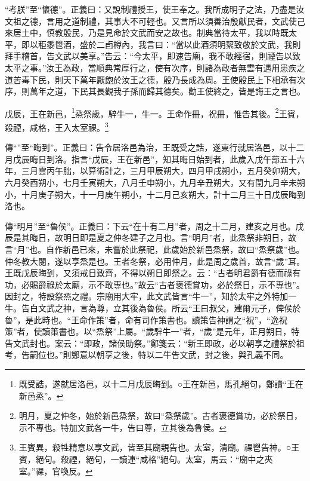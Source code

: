 {\noindent\shu{}\fzkt “考朕”至“懷德”。正義曰：又說制禮授王，使王奉之。我所成明子之法，乃盡是汝文祖之德，言用之道制禮，其事大不可輕也。又言所以須善治殷獻民者，文武使己來居土中，慎教殷民，乃是見命於文武而安之故也。制典當待太平，我以時既太平，即以秬黍鬯酒，盛於二卣樽內，我言曰：“當以此酒須明絜致敬於文武，我則拜手稽首，告文武以美享。”告云：“今太平，即速告廟，我不敢經宿，則禋告以致太平之事。”汝王為政，當順典常厚行之，使有次序，則諸為政者無雲有遇用患疾之道苦毒下民，則天下萬年厭飽於汝王之德，殷乃長成為周。王使殷民上下相承有次序，則萬年之道，下民其長觀我子孫而歸其德矣。勸王使終之，皆是誨王之言也。 \par}

戊辰，王在新邑，\footnote{既受誥，遂就居洛邑，以十二月戊辰晦到。○王在新邑，馬孔絕句，鄭讀“王在新邑烝”。}烝祭歲，騂牛一，牛一。王命作冊，祝冊，惟告其後。\footnote{明月，夏之仲冬，始於新邑烝祭，故曰“烝祭歲”。古者褒德賞功，必於祭日，示不專也。特加文武各一牛，告曰尊，立其後為魯侯。}王賓，殺禋，咸格，王入太室祼。\footnote{王賓異，殺牲精意以享文武，皆至其廟親告也。太室，清廟。祼鬯告神。○王賓，絕句。殺禋，絕句，一讀連“咸格”絕句。太室，馬云：“廟中之夾室。”祼，官喚反。}


{\noindent\zhuan{}\fzbyks 傳“”至“晦到”。正義曰：告令居洛邑為治，王既受之誥，遂東行就居洛邑，以十二月戊辰晦日到洛。指言“戊辰，王在新邑”，知其晦日始到者，此歲入戊午蔀五十六年，三月雲丙午朏，以算術計之，三月甲辰朔大，四月甲戌朔小，五月癸卯朔大，六月癸酉朔小，七月壬寅朔大，八月壬申朔小，九月辛丑朔大，又有閏九月辛未朔小，十月庚子朔大，十一月庚午朔小，十二月己亥朔大，計十二月三十日戊辰晦到洛也。 \par}

{\noindent\zhuan{}\fzbyks 傳“明月”至“魯侯”。正義曰：下云“在十有二月”者，周之十二月，建亥之月也。戊辰是其晦日，故明日即是夏之仲冬建子之月也。言“明月”者，此烝祭非朔日，故言“月”也。自作新邑已來，未嘗於此祭祀，此歲始於新邑烝祭，故曰“烝祭歲”也。仲冬教大閱，遂以享烝是也。王者冬祭，必用仲月，此是周之歲首，故言“歲”耳。王既戊辰晦到，又須戒日致齊，不得以朔日即祭之。云：“古者明君爵有德而祿有功，必賜爵祿於太廟，示不敢專也。”故云“古者褒德賞功，必於祭日，示不專也”。因封之，特設祭烝之禮。宗廟用大牢，此文武皆言“牛一”，知於太牢之外特加一牛。告白文武之神，言為尊，立其後為魯侯。所云“王曰叔父，建爾元子，俾侯於魯”，是此時也。“王命作策”者，命有司作策書也。讀策告神謂之“祝”，“逸祝策”者，使讀策書也。以“烝祭”上屬。“歲騂牛一”者，“歲”是元年，正月朔日，特告文武封也。案云：“即政，諸侯助祭。”鄭箋云：“新王即政，必以朝享之禮祭於祖考，告嗣位也。”則鄭意以朝享之後，特以二牛告文武，封之後，與孔義不同。 \par}

